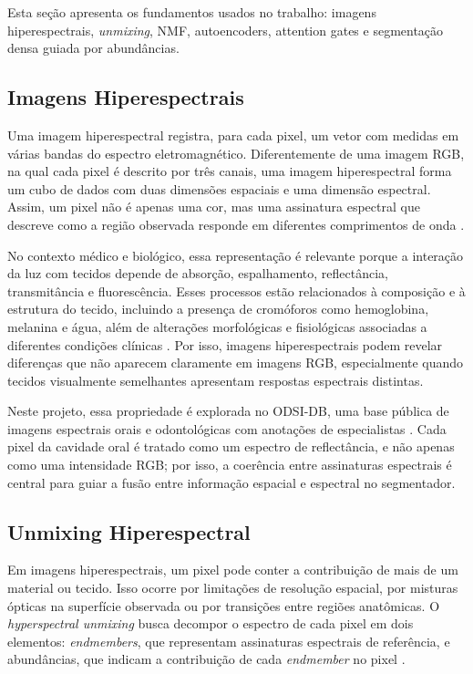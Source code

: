 \documentclass[conference]{IEEEtran}
\begin{document}
Esta seção apresenta os fundamentos usados no trabalho: imagens
hiperespectrais, \textit{unmixing}, NMF, autoencoders, attention gates e
segmentação densa guiada por abundâncias.

\subsection{Imagens Hiperespectrais}

Uma imagem hiperespectral registra, para cada pixel, um vetor com medidas em
várias bandas do espectro eletromagnético. Diferentemente de uma imagem RGB, na
qual cada pixel é descrito por três canais, uma imagem hiperespectral forma um
cubo de dados com duas dimensões espaciais e uma dimensão espectral. Assim, um
pixel não é apenas uma cor, mas uma assinatura espectral que descreve como a
região observada responde em diferentes comprimentos de onda
\cite{bioucasdias2012overview}.

No contexto médico e biológico, essa representação é relevante porque a
interação da luz com tecidos depende de absorção, espalhamento, reflectância,
transmitância e fluorescência. Esses processos estão relacionados à composição e
à estrutura do tecido, incluindo a presença de cromóforos como hemoglobina,
melanina e água, além de alterações morfológicas e fisiológicas associadas a
diferentes condições clínicas \cite{lu2014medicalhsi}. Por isso, imagens
hiperespectrais podem revelar diferenças que não aparecem claramente em imagens
RGB, especialmente quando tecidos visualmente semelhantes apresentam respostas
espectrais distintas.

Neste projeto, essa propriedade é explorada no ODSI-DB, uma base pública de
imagens espectrais orais e odontológicas com anotações de especialistas
\cite{hyttinen2020odsi}. Cada pixel da cavidade oral é tratado como um espectro
de reflectância, e não apenas como uma intensidade RGB; por isso, a coerência
entre assinaturas espectrais é central para guiar a fusão entre informação
espacial e espectral no segmentador.

\subsection{Unmixing Hiperespectral}

Em imagens hiperespectrais, um pixel pode conter a contribuição de mais de um
material ou tecido. Isso ocorre por limitações de resolução espacial, por
misturas ópticas na superfície observada ou por transições entre regiões
anatômicas. O \textit{hyperspectral unmixing} busca decompor o espectro de cada
pixel em dois elementos: \textit{endmembers}, que representam assinaturas
espectrais de referência, e abundâncias, que indicam a contribuição de cada
\textit{endmember} no pixel \cite{bioucasdias2012overview}.
\end{document}
